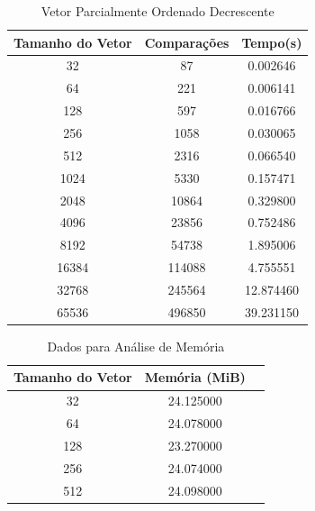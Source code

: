 \documentclass[12pt,a4paper,twoside]{report}
\begin{document}
\begin{table}[h]
  \centering
  \caption{Vetor Parcialmente Ordenado Decrescente \label{tab:pod}}
  \begin{tabular}{ccc} \\\hline
  \textbf{Tamanho do Vetor} & \textbf{Comparações} & \textbf{Tempo(s)} \\\hline
  32                        & 87                   & 0.002646          \\\hline
  64                        & 221                  & 0.006141          \\\hline
  128                       & 597                  & 0.016766          \\\hline
  256                       & 1058                 & 0.030065          \\\hline
  512                       & 2316                 & 0.066540          \\\hline
  1024                      & 5330                 & 0.157471          \\\hline
  2048                      & 10864                & 0.329800          \\\hline
  4096                      & 23856                & 0.752486         \\\hline
  8192                      & 54738                & 1.895006        \\\hline
  16384                     & 114088               & 4.755551        \\\hline
  32768                     & 245564               & 12.874460        \\\hline
  65536                     & 496850               & 39.231150        \\\hline
  \end{tabular}
\end{table}

\begin{table}[h]
  \centering
  \caption{Dados para Análise de Memória \label{tab:memoria}}
  \begin{tabular}{ccc} \\\hline
  \textbf{Tamanho do Vetor} & \textbf{Memória (MiB)} \\\hline
  32                        & 24.125000                  \\\hline
  64                        & 24.078000            \\\hline
  128                       & 23.270000            \\\hline
  256                       & 24.074000            \\\hline
  512                       & 24.098000            \\\hline
  \end{tabular}
\end{table}
\end{document}
